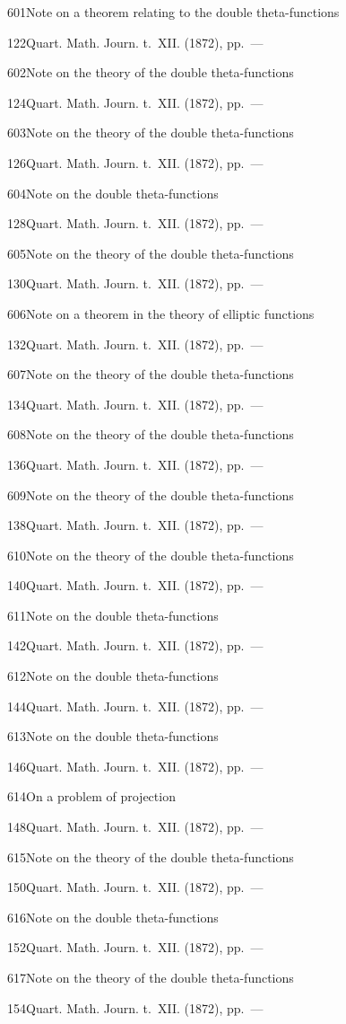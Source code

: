 \documentclass[11pt,a4paper]{book}
\providecommand{\tocentry}[2]{#1\dotfill #2\par}
\begin{document}
\tocentry{601}{Note on a theorem relating to the double theta-functions}{122}{Quart. Math. Journ. t.~XII. (1872), pp.~---}

\tocentry{602}{Note on the theory of the double theta-functions}{124}{Quart. Math. Journ. t.~XII. (1872), pp.~---}

\tocentry{603}{Note on the theory of the double theta-functions}{126}{Quart. Math. Journ. t.~XII. (1872), pp.~---}

\tocentry{604}{Note on the double theta-functions}{128}{Quart. Math. Journ. t.~XII. (1872), pp.~---}

\tocentry{605}{Note on the theory of the double theta-functions}{130}{Quart. Math. Journ. t.~XII. (1872), pp.~---}

\tocentry{606}{Note on a theorem in the theory of elliptic functions}{132}{Quart. Math. Journ. t.~XII. (1872), pp.~---}

\tocentry{607}{Note on the theory of the double theta-functions}{134}{Quart. Math. Journ. t.~XII. (1872), pp.~---}

\tocentry{608}{Note on the theory of the double theta-functions}{136}{Quart. Math. Journ. t.~XII. (1872), pp.~---}

\tocentry{609}{Note on the theory of the double theta-functions}{138}{Quart. Math. Journ. t.~XII. (1872), pp.~---}

\tocentry{610}{Note on the theory of the double theta-functions}{140}{Quart. Math. Journ. t.~XII. (1872), pp.~---}

\tocentry{611}{Note on the double theta-functions}{142}{Quart. Math. Journ. t.~XII. (1872), pp.~---}

\tocentry{612}{Note on the double theta-functions}{144}{Quart. Math. Journ. t.~XII. (1872), pp.~---}

\tocentry{613}{Note on the double theta-functions}{146}{Quart. Math. Journ. t.~XII. (1872), pp.~---}

\newpage

\tocentry{614}{On a problem of projection}{148}{Quart. Math. Journ. t.~XII. (1872), pp.~---}

\tocentry{615}{Note on the theory of the double theta-functions}{150}{Quart. Math. Journ. t.~XII. (1872), pp.~---}

\tocentry{616}{Note on the double theta-functions}{152}{Quart. Math. Journ. t.~XII. (1872), pp.~---}

\tocentry{617}{Note on the theory of the double theta-functions}{154}{Quart. Math. Journ. t.~XII. (1872), pp.~---}
\end{document}
